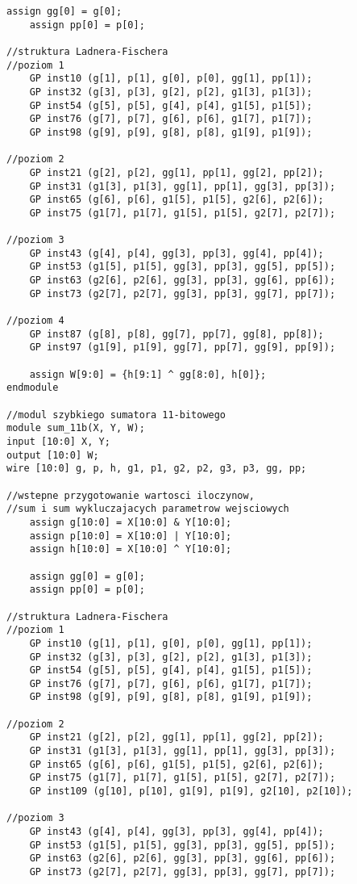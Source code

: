 \documentclass[a4paper]{article}
\begin{document}
\begin{lstlisting}[label=calosc]
	assign gg[0] = g[0];
	assign pp[0] = p[0];

//struktura Ladnera-Fischera
//poziom 1
	GP inst10 (g[1], p[1], g[0], p[0], gg[1], pp[1]);
	GP inst32 (g[3], p[3], g[2], p[2], g1[3], p1[3]);
	GP inst54 (g[5], p[5], g[4], p[4], g1[5], p1[5]);
	GP inst76 (g[7], p[7], g[6], p[6], g1[7], p1[7]);
	GP inst98 (g[9], p[9], g[8], p[8], g1[9], p1[9]);

//poziom 2
	GP inst21 (g[2], p[2], gg[1], pp[1], gg[2], pp[2]);
	GP inst31 (g1[3], p1[3], gg[1], pp[1], gg[3], pp[3]);
	GP inst65 (g[6], p[6], g1[5], p1[5], g2[6], p2[6]);
	GP inst75 (g1[7], p1[7], g1[5], p1[5], g2[7], p2[7]);

//poziom 3
	GP inst43 (g[4], p[4], gg[3], pp[3], gg[4], pp[4]);
	GP inst53 (g1[5], p1[5], gg[3], pp[3], gg[5], pp[5]);
	GP inst63 (g2[6], p2[6], gg[3], pp[3], gg[6], pp[6]);
	GP inst73 (g2[7], p2[7], gg[3], pp[3], gg[7], pp[7]);

//poziom 4
	GP inst87 (g[8], p[8], gg[7], pp[7], gg[8], pp[8]);
	GP inst97 (g1[9], p1[9], gg[7], pp[7], gg[9], pp[9]);

	assign W[9:0] = {h[9:1] ^ gg[8:0], h[0]};
endmodule

//modul szybkiego sumatora 11-bitowego
module sum_11b(X, Y, W);
input [10:0] X, Y;
output [10:0] W;
wire [10:0] g, p, h, g1, p1, g2, p2, g3, p3, gg, pp;

//wstepne przygotowanie wartosci iloczynow, 
//sum i sum wykluczajacych parametrow wejsciowych
	assign g[10:0] = X[10:0] & Y[10:0];
	assign p[10:0] = X[10:0] | Y[10:0];
	assign h[10:0] = X[10:0] ^ Y[10:0];

	assign gg[0] = g[0];
	assign pp[0] = p[0];

//struktura Ladnera-Fischera
//poziom 1
	GP inst10 (g[1], p[1], g[0], p[0], gg[1], pp[1]);
	GP inst32 (g[3], p[3], g[2], p[2], g1[3], p1[3]);
	GP inst54 (g[5], p[5], g[4], p[4], g1[5], p1[5]);
	GP inst76 (g[7], p[7], g[6], p[6], g1[7], p1[7]);
	GP inst98 (g[9], p[9], g[8], p[8], g1[9], p1[9]);

//poziom 2
	GP inst21 (g[2], p[2], gg[1], pp[1], gg[2], pp[2]);
	GP inst31 (g1[3], p1[3], gg[1], pp[1], gg[3], pp[3]);
	GP inst65 (g[6], p[6], g1[5], p1[5], g2[6], p2[6]);
	GP inst75 (g1[7], p1[7], g1[5], p1[5], g2[7], p2[7]);
	GP inst109 (g[10], p[10], g1[9], p1[9], g2[10], p2[10]);

//poziom 3
	GP inst43 (g[4], p[4], gg[3], pp[3], gg[4], pp[4]);
	GP inst53 (g1[5], p1[5], gg[3], pp[3], gg[5], pp[5]);
	GP inst63 (g2[6], p2[6], gg[3], pp[3], gg[6], pp[6]);
	GP inst73 (g2[7], p2[7], gg[3], pp[3], gg[7], pp[7]);


\end{lstlisting}
\end{document}
